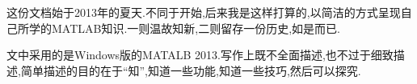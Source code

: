 这份文档始于2013年的夏天.不同于开始,后来我是这样打算的,以简洁的方式呈现自己所学的MATLAB知识.一则温故知新,二则留存一份历史,如是而已.\par
文中采用的是Windows版的MATALB 2013.写作上既不全面描述,也不过于细致描述,简单描述的目的在于“知”,知道一些功能,知道一些技巧,然后可以探究.
